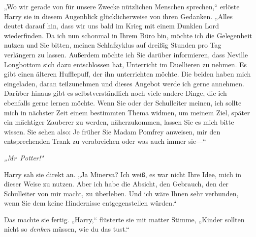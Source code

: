 „Wo wir gerade von für unsere Zwecke nützlichen Menschen sprechen,“ erlöste Harry sie in diesem Augenblick glücklicherweise von ihren Gedanken. „Alles deutet darauf hin, dass wir uns bald im Krieg mit einem Dunklen Lord wiederfinden. Da ich nun schonmal in Ihrem Büro bin, möchte ich die Gelegenheit nutzen und Sie bitten, meinen Schlafzyklus auf dreißig Stunden pro Tag verlängern zu lassen. Außerdem möchte ich Sie darüber informieren, dass Neville Longbottom sich dazu entschlossen hat, Unterricht im Duellieren zu nehmen. Es gibt einen älteren Hufflepuff, der ihn unterrichten möchte. Die beiden haben mich eingeladen, daran teilzunehmen und dieses Angebot werde ich gerne annehmen.
Darüber hinaus gibt es selbstverständlich noch viele andere Dinge, die ich ebenfalls gerne lernen möchte. Wenn Sie oder der Schulleiter meinen, ich sollte mich in nächster Zeit einem bestimmten Thema widmen, um meinem Ziel, später ein mächtiger Zauberer zu werden, näherzukommen, lassen Sie es mich bitte wissen.
Sie sehen also: Je früher Sie Madam Pomfrey anweisen, mir den entsprechenden Trank zu verabreichen oder was auch immer sie—“

\emph{„Mr~Potter!"}

Harry sah sie direkt an. „Ja Minerva? Ich weiß, es war nicht Ihre Idee, mich in dieser Weise zu nutzen. Aber ich habe die Absicht, den Gebrauch, den der Schulleiter von mir macht, zu überleben. Und ich wäre Ihnen sehr verbunden, wenn Sie dem keine Hindernisse entgegenstellen würden.“

Das machte sie fertig. „Harry,“ flüsterte sie mit matter Stimme, „Kinder sollten nicht so \emph{denken} müssen, wie du das tust.“

